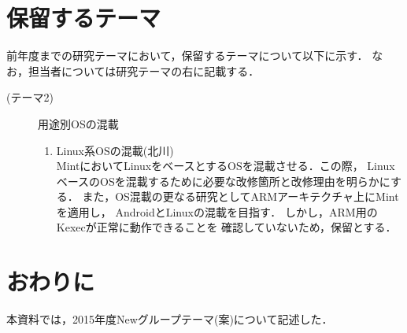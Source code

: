 \documentclass[12pt]{jsarticle}
\begin{document}
\section{保留するテーマ}
前年度までの研究テーマにおいて，保留するテーマについて以下に示す．
なお，担当者については研究テーマの右に記載する．
\begin{description}
    \item[(テーマ2)]用途別OSの混載
        \begin{enumerate}
            \item Linux系OSの混載(北川)\\
                MintにおいてLinuxをベースとするOSを混載させる．この際，
                LinuxベースのOSを混載するために必要な改修箇所と改修理由を明らかにする．
                また，OS混載の更なる研究としてARMアーキテクチャ上にMintを適用し，
                AndroidとLinuxの混載を目指す．
                しかし，ARM用のKexecが正常に動作できることを
                確認していないため，保留とする．
        \end{enumerate}
\end{description}
\section{おわりに}
本資料では，2015年度Newグループテーマ(案)について記述した．
\end{document}
